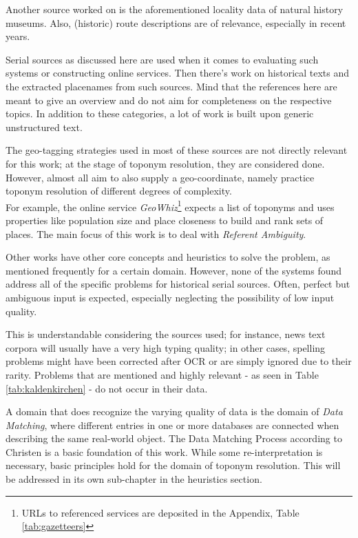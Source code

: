 \documentclass[11pt]{article}
\begin{document}
Another source worked on is the aforementioned locality data of natural history museums. \cite{beaman03}\cite{wieczorek04} Also, (historic) route descriptions are of relevance, especially in recent years. \cite{blank15}\cite{moncla14}\cite{piotrowski10}

Serial sources as discussed here are used when it comes to evaluating such systems or constructing online services. \cite{adelfio13b}\cite{adelfio13a}\cite{doerr2007} Then there's work on historical texts and the extracted placenames from such sources. \cite{berman08}\cite{grover10}\cite{rupp13} Mind that the references here are meant to give an overview and do not aim for completeness on the respective topics. In addition to these categories, a lot of work is built upon generic unstructured text.

The geo-tagging strategies used in most of these sources are not directly relevant for this work; at the stage of toponym resolution, they are considered done. However, almost all aim to also supply a geo-coordinate, namely practice toponym resolution of different degrees of complexity.\\

For example, the online service \emph{GeoWhiz}\footnote{URLs to referenced services are deposited in the Appendix, Table \ref{tab:gazetteers}} expects a list of toponyms and uses properties like population size and place closeness to build and rank sets of places. The main focus of this work is to deal with \emph{Referent Ambiguity}.

Other works have other core concepts and heuristics to solve the problem, as mentioned frequently for a certain domain. However, none of the systems found address all of the specific problems for historical serial sources. Often, perfect but ambiguous input is expected, especially neglecting the possibility of low input quality.

This is understandable considering the sources used; for instance, news text corpora will usually have a very high typing quality; in other cases, spelling problems might have been corrected after OCR or are simply ignored due to their rarity. Problems that are mentioned and highly relevant - as seen in Table \ref{tab:kaldenkirchen} - do not occur in their data.

A domain that does recognize the varying quality of data is the domain of \emph{Data Matching}, where different entries in one or more databases are connected when describing the same real-world object. The Data Matching Process according to Christen\cite{christen12} is a basic foundation of this work. While some re-interpretation is necessary, basic principles hold for the domain of toponym resolution. This will be addressed in its own sub-chapter in the heuristics section.
\end{document}

